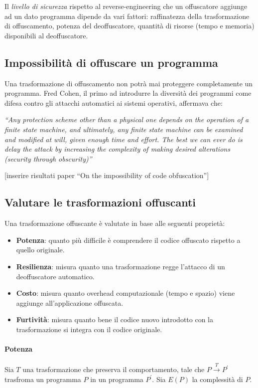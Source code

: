 \documentclass[a4paper,oneside,openright,titlepage,10pt,footinclude,headinclude]{scrbook}
\begin{document}
Il \emph{livello di sicurezza} rispetto al reverse-engineering che un offuscatore aggiunge  ad un dato programma dipende da vari fattori: raffinatezza della trasformazione di offuscamento, potenza del deoffuscatore, quantità di risorse  (tempo e memoria) disponibili al deoffuscatore.\\

\subsection{Impossibilità di offuscare un programma}

Una trasformazione di offuscamento non potrà mai proteggere completamente un programma.
Fred Cohen, il primo ad introdurre la diversità dei programmi come difesa contro gli attacchi automatici ai sistemi operativi, affermava che: \smallskip

\textit{“Any protection scheme other than a physical one depends on the operation of a finite state machine, and ultimately, any finite state machine can be examined and modified at will, given enough time and effort. The best we can ever do is delay the attack by increasing the complexity of making desired alterations (security through obscurity)”}\smallskip

[inserire risultati paper ``On the impossibility of code obfuscation'']


\subsection{Valutare le trasformazioni offuscanti}
Una trasformazione offuscante è valutate in base alle seguenti proprietà:
\begin{itemize}
\item
\textbf{Potenza}: quanto più difficile è comprendere il codice offuscato rispetto a quello originale.
\item
\textbf{Resilienza}: misura quanto una trasformazione regge l'attacco di un deoffuscatore automatico.
\item
\textbf{Costo}: misura quanto overhead computazionale (tempo e spazio) viene aggiunge all'applicazione offuscata.
\item
\textbf{Furtività}: misura quanto bene il codice nuovo introdotto con la trasformazione si integra con il codice originale.
\end{itemize}

\paragraph{Potenza} 
Sia $T$ una trasformazione che preserva il comportamento, tale che $P \xrightarrow{T} P^{'}$ trasfroma un programma $P$ in un programma $P^{'}$. Sia $E(P)$ la complessità di $P$.\smallskip
\end{document}

